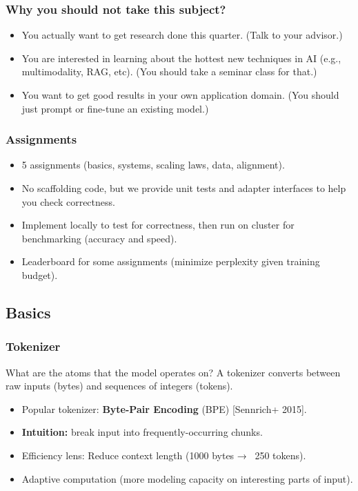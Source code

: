 \documentclass[12pt,twoside]{article}
\begin{document}
\subsubsection*{Why you should not take this subject?}

\begin{itemize}
    \item You actually want to get research done this quarter. (Talk to your advisor.)
    \item You are interested in learning about the hottest new techniques in AI (e.g., multimodality, RAG, etc). (You should take a seminar class for that.)
    \item You want to get good results in your own application domain. (You should just prompt or fine-tune an existing model.)
\end{itemize}

\subsubsection*{Assignments}

\begin{itemize}
    \item 5 assignments (basics, systems, scaling laws, data, alignment).
    \item No scaffolding code, but we provide unit tests and adapter interfaces to help you check correctness.
    \item Implement locally to test for correctness, then run on cluster for benchmarking (accuracy and speed).
    \item Leaderboard for some assignments (minimize perplexity given training budget).
\end{itemize}

\subsection*{Basics}

\subsubsection*{Tokenizer}

What are the atoms that the model operates on? A tokenizer converts between raw inputs (bytes) and sequences of integers (tokens).

\begin{itemize}
    \item Popular tokenizer: \textbf{Byte-Pair Encoding} (BPE) [Sennrich+ 2015].
    \item \textbf{Intuition:} break input into frequently-occurring chunks.
    \item Efficiency lens: Reduce context length (1000 bytes → ~250 tokens).
    \item Adaptive computation (more modeling capacity on interesting parts of input).
\end{itemize}
\end{document}
